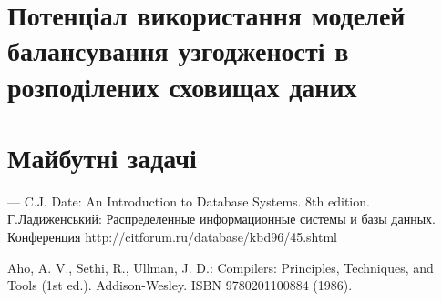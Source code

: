 \documentclass[14pt]{vakthesis}
\begin{document}
 \section{Потенціал використання моделей балансування узгодженості в розподілених сховищах даних}
 \section{Майбутні задачі}

\begin{thebibliography}{99}
 — 
C.J. Date: 
An Introduction to Database Systems. 8th edition.
%
Г.Ладиженський:
Распределенные информационные системы и базы данных.
Конференция
http://citforum.ru/database/kbd96/45.shtml

Aho, A. V., Sethi, R., Ullman, J. D.: 
Compilers: Principles, Techniques, and Tools (1st ed.). 
Addison-Wesley. ISBN 9780201100884 
(1986).
%



\end{thebibliography}
\end{document}
